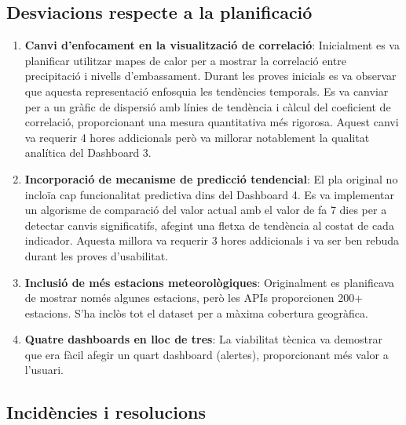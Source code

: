 \subsection{Desviacions respecte a la planificació}

\begin{enumerate}
    \item \textbf{Canvi d'enfocament en la visualització de correlació}: Inicialment es va planificar utilitzar mapes de calor per a mostrar la correlació entre precipitació i nivells d'embassament. Durant les proves inicials es va observar que aquesta representació enfosquia les tendències temporals. Es va canviar per a un gràfic de dispersió amb línies de tendència i càlcul del coeficient de correlació, proporcionant una mesura quantitativa més rigorosa. Aquest canvi va requerir 4 hores addicionals però va millorar notablement la qualitat analítica del Dashboard 3.
    
    \item \textbf{Incorporació de mecanisme de predicció tendencial}: El pla original no incloïa cap funcionalitat predictiva dins del Dashboard 4. Es va implementar un algorisme de comparació del valor actual amb el valor de fa 7 dies per a detectar canvis significatifs, afegint una fletxa de tendència al costat de cada indicador. Aquesta millora va requerir 3 hores addicionals i va ser ben rebuda durant les proves d'usabilitat.
    
    \item \textbf{Inclusió de més estacions meteorològiques}: Originalment es planificava de mostrar només algunes estacions, però les APIs proporcionen 200+ estacions. S'ha inclòs tot el dataset per a màxima cobertura geogràfica.
    
    \item \textbf{Quatre dashboards en lloc de tres}: La viabilitat tècnica va demostrar que era fàcil afegir un quart dashboard (alertes), proporcionant més valor a l'usuari.
\end{enumerate}

\subsection{Incidències i resolucions}

